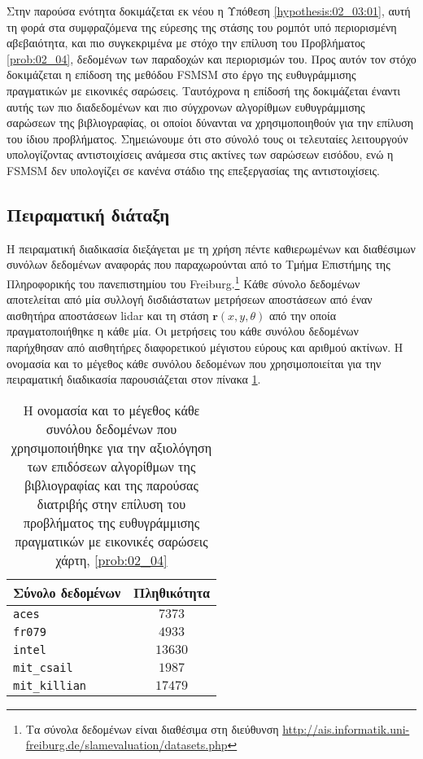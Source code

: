 Στην παρούσα ενότητα δοκιμάζεται εκ νέου η Υπόθεση \ref{hypothesis:02_03:01},
αυτή τη φορά στα συμφραζόμενα της εύρεσης της στάσης του ρομπότ υπό
περιορισμένη αβεβαιότητα, και πιο συγκεκριμένα με στόχο την επίλυση του
Προβλήματος \ref{prob:02_04}, δεδομένων των παραδοχών και περιορισμών του.
Προς αυτόν τον στόχο δοκιμάζεται η επίδοση της μεθόδου FSMSM στο έργο της
ευθυγράμμισης πραγματικών με εικονικές σαρώσεις. Ταυτόχρονα η επίδοσή της
δοκιμάζεται έναντι αυτής των πιο διαδεδομένων και πιο σύγχρονων αλγορίθμων
ευθυγράμμισης σαρώσεων της βιβλιογραφίας, οι οποίοι δύνανται να χρησιμοποιηθούν
για την επίλυση του ίδιου προβλήματος. Σημειώνουμε ότι στο σύνολό τους οι
τελευταίες λειτουργούν υπολογίζοντας αντιστοιχίσεις ανάμεσα στις ακτίνες των
σαρώσεων εισόδου, ενώ η FSMSM δεν υπολογίζει σε κανένα στάδιο της επεξεργασίας
της αντιστοιχίσεις.

\subsection{Πειραματική διάταξη}
\label{subsection:02_04_05:01}

Η πειραματική διαδικασία διεξάγεται με τη χρήση πέντε καθιερωμένων και
διαθέσιμων συνόλων δεδομένων αναφοράς που παραχωρούνται από το Τμήμα Επιστήμης
της Πληροφορικής του πανεπιστημίου του Freiburg.\footnote{Τα σύνολα δεδομένων
είναι διαθέσιμα στη διεύθυνση
\url{http://ais.informatik.uni-freiburg.de/slamevaluation/datasets.php}} Κάθε
σύνολο δεδομένων αποτελείται από μία συλλογή δισδιάστατων μετρήσεων
αποστάσεων από έναν αισθητήρα αποστάσεων lidar και τη στάση
$\bm{r}(x,y,\theta)$ από την οποία πραγματοποιήθηκε η κάθε μία. Οι μετρήσεις
του κάθε συνόλου δεδομένων παρήχθησαν από αισθητήρες διαφορετικού μέγιστου
εύρους και αριθμού ακτίνων. Η ονομασία και το μέγεθος κάθε συνόλου δεδομένων
που χρησιμοποιείται για την πειραματική διαδικασία παρουσιάζεται στον πίνακα
\ref{tbl:02:04_05:dataset_sizes}.\vfill

\begin{table}[h]\centering
  \begin{tabular}{lc}
  Σύνολο δεδομένων      & Πληθικότητα  \\  \toprule
  \texttt{aces}         & $7373$       \\
  \texttt{fr079}        & $4933$       \\
  \texttt{intel}        & $13630$      \\
  \texttt{mit\_csail}   & $1987$       \\
  \texttt{mit\_killian} & $17479$      \\  \bottomrule
  \end{tabular}
  \vspace{0.5cm}
\caption{\small Η ονομασία και το μέγεθος κάθε συνόλου δεδομένων που
         χρησιμοποιήθηκε για την αξιολόγηση των επιδόσεων αλγορίθμων της
         βιβλιογραφίας και της παρούσας διατριβής στην επίλυση του προβλήματος
         της ευθυγράμμισης πραγματικών με εικονικές σαρώσεις χάρτη,
         \ref{prob:02_04}}
  \label{tbl:02:04_05:dataset_sizes}
\end{table}
\vfill

